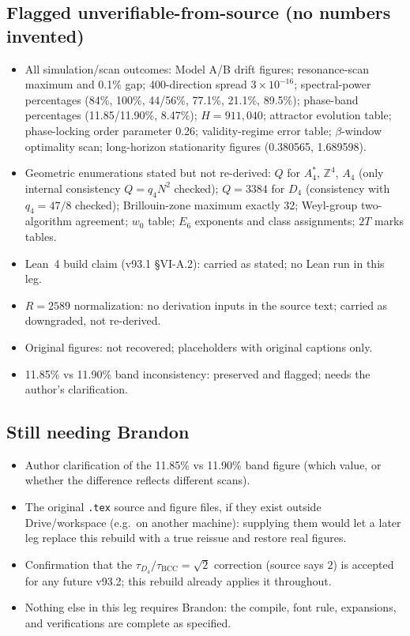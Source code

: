 \documentclass[11pt,a4paper]{article}
\begin{document}
\subsection*{Flagged unverifiable-from-source (no numbers invented)}
\begin{itemize}
\item All simulation/scan outcomes: Model A/B drift figures; resonance-scan maximum and 0.1\% gap; 400-direction spread $3\times10^{-16}$; spectral-power percentages (84\%, 100\%, 44/56\%, 77.1\%, 21.1\%, 89.5\%); phase-band percentages (11.85/11.90\%, 8.47\%); $H = 911{,}040$; attractor evolution table; phase-locking order parameter 0.26; validity-regime error table; $\beta$-window optimality scan; long-horizon stationarity figures (0.380565, 1.689598).
\item Geometric enumerations stated but not re-derived: $Q$ for $A_4^*$, $\mathbb{Z}^4$, $A_4$ (only internal consistency $Q = q_4N^2$ checked); $Q = 3384$ for $D_4$ (consistency with $q_4 = 47/8$ checked); Brillouin-zone maximum exactly 32; Weyl-group two-algorithm agreement; $w_0$ table; $E_6$ exponents and class assignments; $2T$ marks tables.
\item Lean~4 build claim (v93.1 \S VI-A.2): carried as stated; no Lean run in this leg.
\item $R = 2589$ normalization: no derivation inputs in the source text; carried as downgraded, not re-derived.
\item Original figures: not recovered; placeholders with original captions only.
\item 11.85\% vs 11.90\% band inconsistency: preserved and flagged; needs the author's clarification.
\end{itemize}

\subsection*{Still needing Brandon}
\begin{itemize}
\item Author clarification of the 11.85\% vs 11.90\% band figure (which value, or whether the difference reflects different scans).
\item The original \texttt{.tex} source and figure files, if they exist outside Drive/workspace (e.g.\ on another machine): supplying them would let a later leg replace this rebuild with a true reissue and restore real figures.
\item Confirmation that the $\tau_{D_4}/\tau_{\mathrm{BCC}} = \sqrt{2}$ correction (source says $2$) is accepted for any future v93.2; this rebuild already applies it throughout.
\item Nothing else in this leg requires Brandon: the compile, font rule, expansions, and verifications are complete as specified.
\end{itemize}
\end{document}
